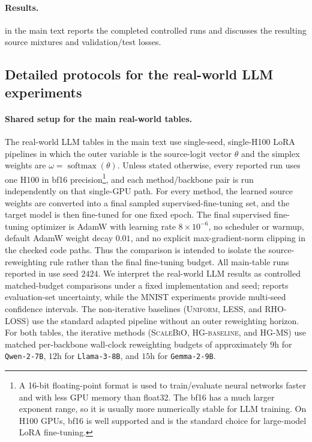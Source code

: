 \documentclass{article}
\theoremstyle{normaltheorem}
\newcommand{\softmax}{\operatorname{softmax}}
\begin{document}
\paragraph{Results.}
 in the main text reports the completed controlled runs and discusses the resulting source
mixtures and validation/test losses.

\subsection{Detailed protocols for the real-world LLM experiments}\label{append:exp-llm-real}
\paragraph{Shared setup for the main real-world tables.}
The real-world LLM tables in the main text use single-seed, single-H100 LoRA pipelines in which the outer variable is the source-logit vector $\theta$ and the simplex weights are $\omega=\softmax(\theta)$. Unless stated otherwise, every reported run uses one H100 in bf16 precision\footnote{A 16-bit floating-point format is used to train/evaluate neural networks faster and with less GPU memory than float32. The bf16 has a much larger exponent range, so it is usually more numerically stable for LLM training. On H100 GPUs, bf16 is well supported and is the standard choice for large-model LoRA fine-tuning.}, and each method/backbone pair is run independently on that single-GPU path. For every method, the learned source weights are converted into a final sampled supervised-fine-tuning set, and the target model is then fine-tuned for one fixed epoch. The final supervised fine-tuning optimizer is AdamW with learning rate \(8\times10^{-6}\), no scheduler or warmup, default AdamW weight decay \(0.01\), and no explicit max-gradient-norm clipping in the checked code paths. Thus the comparison is intended to isolate the source-reweighting rule rather than the final fine-tuning budget. All main-table runs reported in  use seed $2424$. We interpret the real-world LLM results as controlled matched-budget comparisons under a fixed implementation and seed;  reports evaluation-set uncertainty, while the MNIST experiments provide multi-seed confidence intervals. The non-iterative baselines (\textsc{Uniform}, \textsc{LESS}, and \textsc{RHO-LOSS}) use the standard adapted pipeline without an outer reweighting horizon. For both tables, the iterative methods (\textsc{ScaleBiO}, \textsc{HG-baseline}, and \textsc{HG-MS}) use matched per-backbone wall-clock reweighting budgets of approximately $9$h for \texttt{Qwen-2-7B}, $12$h for \texttt{Llama-3-8B}, and $15$h for \texttt{Gemma-2-9B}.
\end{document}
